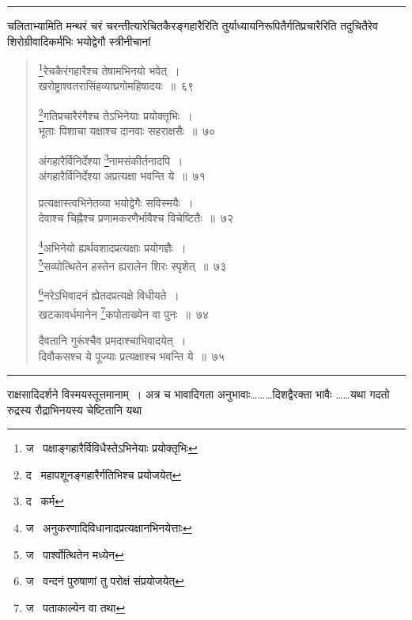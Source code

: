 \documentclass[11pt, openany]{book}
\begin{document}
\hrule

\vspace{2mm}
\noindent
चलिताभ्यामिति मन्थरं चरं चरन्तीत्यारेचितकैरङ्गहारैरिति तुर्याध्यायनिरूपितैर्गतिप्रचारैरिति तदुचितैरेव शिरोग्रीवादिकर्मभिः भयोद्वेगौ स्त्रीनीचानां

\newpage

\begin{quote}
{\na \renewcommand{\thefootnote}{1}\footnote{ज \textendash\  पक्षाङ्गहारैर्विविधैस्तेऽभिनेयाः प्रयोक्तृभिः}रेचकैरंगहारैश्च तेषामभिनयो भवेत्~।\\
खरोष्ट्राश्वतरासिंहव्याघ्रगोमहिषादयः~॥~६९

\renewcommand{\thefootnote}{2}\footnote{द \textendash\  महापशूनङ्गहारैर्गतिभिश्च प्रयोजयेत्}गतिप्रचारैरंगैश्च तेऽभिनेयाः प्रयोक्तृभिः~।\\
भूताः पिशाचा यक्षाश्च दानवाः सहराक्षसैः~॥~७० 

अंगहारैर्विनिर्देश्या \renewcommand{\thefootnote}{3}\footnote{द \textendash\  कर्म}नामसंकीर्तनादपि~।\\
अंगहारैर्विनिर्देश्या अप्रत्यक्षा भवन्ति ये~॥~७१

प्रत्यक्षास्त्वभिनेतव्या भयोद्वेगैः सविस्मयैः~।\\
देवाश्च चिह्नैश्च प्रणामकरणैर्भावैश्च विचेष्टितैः~॥~७२

\renewcommand{\thefootnote}{4}\footnote{ज \textendash\  अनुकरणादिविधानादप्रत्यक्षानभिनयेत्ताः}अभिनेयो ह्यर्थवशादप्रत्यक्षाः प्रयोगज्ञैः~।\\
\renewcommand{\thefootnote}{5}\footnote{ज \textendash\  पार्श्वोत्थितेन मध्येन}सव्योत्थितेन हस्तेन ह्यरालेन शिरः स्पृशेत्~॥~७३

\renewcommand{\thefootnote}{6}\footnote{ज \textendash\  वन्दनं पुरुषाणां तु परोक्षं संप्रयोजयेत्}नरेऽभिवादनं ह्येतदप्रत्यक्षे विधीयते~।\\
खटकावर्धमानेन \renewcommand{\thefootnote}{7}\footnote{ज \textendash\  पताकाल्येन वा तथा}कपोताख्येन वा पुनः~॥~७४

दैवतानि गुरूंश्चैव प्रमदाश्चाभिवादयेत्~।\\
दिवौकसश्च ये पूज्याः प्रत्यक्षाश्च भवन्ति ये~॥~७५}
\end{quote}

\hrule

\vspace{2mm}
\begin{sloppypar}
\noindent
राक्षसादिदर्शने विस्मयस्तूत्तमानाम्~। अत्र च भावादिगता अनुभावाः\ldots \ldots \ldots दिशद्वैरक्ता भावैः \ldots \ldots यथा गदतो रुद्रस्य रौद्राभिनयस्य चेष्टितानि यथा
\end{sloppypar}
\end{document}
